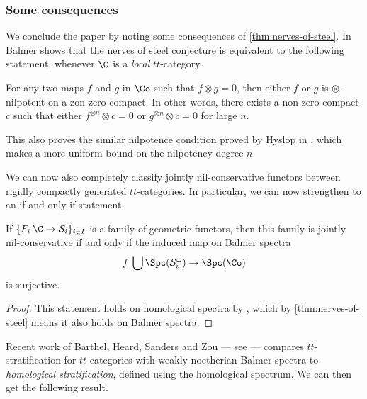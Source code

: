 \subsubsection{Some consequences}

We conclude the paper by noting some consequences of \cref{thm:nerves-of-steel}. In \cite[A.1]{balmer_2020} Balmer shows that the nerves of steel conjecture is equivalent to the following statement, whenever $\C$ is a \emph{local} $tt$-category. 

\begin{corollary}
    For any two maps $f$ and $g$ in $\Co$ such that $f\otimes g = 0$, then either $f$ or $g$ is $\otimes$-nilpotent on a zon-zero compact. In other words, there exists a non-zero compact $c$ such that either $f^{\otimes n} \otimes c =0$ or $g^{\otimes n} \otimes c = 0$ for large $n$.  
\end{corollary}

\begin{remark}
    This also proves the similar nilpotence condition proved by Hyslop in \cite[4.3]{hyslop_2024}, which makes a more uniform bound on the nilpotency degree $n$. 
\end{remark}

We can now also completely classify jointly nil-conservative functors between rigidly compactly generated $tt$-categories. In particular, we can now strengthen \cite[1.4]{barthel_castellana_heard_sanders_2024} to an if-and-only-if statement. 

\begin{corollary}
    If $\{F_i\: \C \to \mathcal{S}_i\}_{i\in I}$ is a family of geometric functors, then this family is jointly nil-conservative if and only if the induced map on Balmer spectra 
    \[f\: \bigcup \Spc(\mathcal{S}^\omega_i) \to \Spc(\Co)\]
    is surjective. 
\end{corollary}
\begin{proof}
    This statement holds on homological spectra by \cite[1.9]{barthel_castellana_heard_sanders_2024}, which by \cref{thm:nerves-of-steel} means it also holds on Balmer spectra. 
\end{proof}

Recent work of Barthel, Heard, Sanders and Zou --- see \cite{barthel_heard_sanders_zou_2024} --- compares $tt$-stratification for $tt$-categories with weakly noetherian Balmer spectra to \emph{homological stratification}, defined using the homological spectrum. We can then get the following result. 

